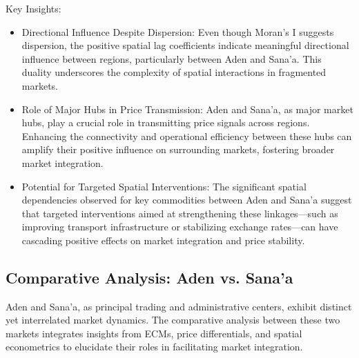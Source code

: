 Key Insights:
\begin{itemize}
\item Directional Influence Despite Dispersion: Even though Moran's I suggests dispersion, the positive spatial lag coefficients indicate meaningful directional influence between regions, particularly between Aden and Sana'a. This duality underscores the complexity of spatial interactions in fragmented markets.

\item Role of Major Hubs in Price Transmission: Aden and Sana'a, as major market hubs, play a crucial role in transmitting price signals across regions. Enhancing the connectivity and operational efficiency between these hubs can amplify their positive influence on surrounding markets, fostering broader market integration.

\item Potential for Targeted Spatial Interventions: The significant spatial dependencies observed for key commodities between Aden and Sana'a suggest that targeted interventions aimed at strengthening these linkages—such as improving transport infrastructure or stabilizing exchange rates—can have cascading positive effects on market integration and price stability.
\end{itemize}

\subsection{Comparative Analysis: Aden vs. Sana'a}

Aden and Sana'a, as principal trading and administrative centers, exhibit distinct yet interrelated market dynamics. The comparative analysis between these two markets integrates insights from ECMs, price differentials, and spatial econometrics to elucidate their roles in facilitating market integration.

